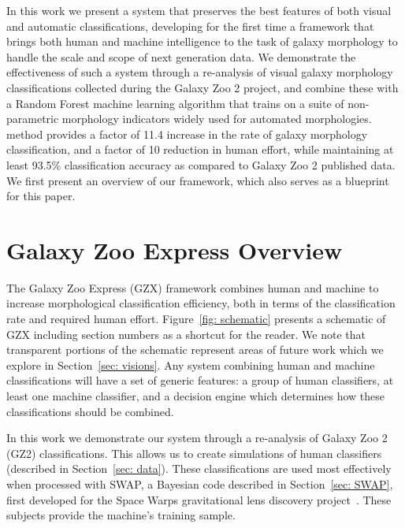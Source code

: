\documentclass[twocolumn, trackchanges, linenumbers]{aastex6}%
\begin{document}
 In this work we present a system that preserves the best features of both visual 
and automatic classifications, developing for the first time a framework that 
brings both human and machine intelligence to the task of galaxy morphology to 
handle the scale and scope of next generation data. We demonstrate the 
effectiveness of such a system through a re-analysis of visual galaxy morphology
 classifications collected during the Galaxy Zoo 2 project, and combine these with a 
Random Forest machine learning algorithm that trains on a suite of non-parametric
 morphology indicators widely used for automated morphologies. 
  method 
provides a factor of 11.4 increase in the rate of galaxy morphology classification, 
and a factor of 10 reduction in human effort, while maintaining at least 93.5\% 
classification accuracy as compared to Galaxy Zoo 2 published data. 
We first present an overview of our framework, which also serves as a blueprint for this paper. 


\section{Galaxy Zoo Express Overview}

The Galaxy Zoo Express (GZX) framework combines human and machine to
 increase morphological classification efficiency, both in terms of the classification rate 
and required human effort. Figure~\ref{fig: schematic} presents a schematic of 
GZX including section numbers as a shortcut for the reader. We note that transparent 
portions  of the schematic represent areas of future work which we explore in 
Section~\ref{sec: visions}. Any system combining human and machine classifications 
will have a set of generic features: a group of human classifiers, at least one 
machine classifier, and a decision engine which determines how these 
classifications should be combined.

In this work we demonstrate our system through a re-analysis of  Galaxy Zoo 2 (GZ2)
 classifications. This allows us to  create simulations of human classifiers (described in
 Section~\ref{sec: data}). These classifications are used most effectively when processed 
with SWAP, a Bayesian code described in Section~\ref{sec: SWAP}, first developed 
for the Space Warps gravitational lens discovery project~\citep{Marshall2016}. 
These subjects provide the machine's training sample. 
\end{document}
